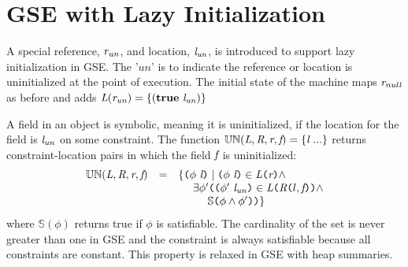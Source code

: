 \section{GSE with Lazy Initialization}

A special reference, $\emph{r}_\mathit{un}$, and location,
$\emph{l}_\mathit{un}$, is introduced to support lazy initialization
in GSE. The '$\mathit{un}$' is to indicate the reference or location
is uninitialized at the point of execution. The initial state of the
machine maps $\emph{r}_\mathit{null}$ as before and adds
$\emph{L}(\emph{r}_\mathit{un}) = \{(\textbf{true}\ \emph{l}_\mathit{un})\}$

A field in an object is symbolic, meaning it is uninitialized, if the
location for the field is $\emph{l}_\mathit{un}$ on some constraint. The function
$\mathbb{UN}(\emph{L}, \emph{R}, \emph{r}, \emph{f}) =
\{\emph{l}\ ...\}$ returns constraint-location pairs in which the field $\emph{f}$
is uninitialized:
\[
\begin{array}{rcl}
\mathbb{UN}(\cfgnt{L}, \cfgnt{R}, \cfgnt{r}, \cfgnt{f}) & = &\{ \lp\phi\ \cfgnt{l}\rp \mid \lp \phi\ \cfgnt{l}\rp  \in \cfgnt{L}\lp \cfgnt{r}\rp  \wedge \\
& & \ \ \ \ \exists \phi^\prime \lp \lp \phi^\prime\ \cfgnt{l}_\mathit{un}\rp  \in \cfgnt{L}\lp \cfgnt{R}\lp l,\cfgnt{f}\rp\rp \wedge \\
& & \ \ \ \ \ \ \ \ \mathbb{S}\lp \phi \wedge \phi^\prime \rp\rp\}\\
\end{array}
\]
where $\mathbb{S}(\phi)$ returns true if $\phi$ is satisfiable. The
cardinality of the set is never greater than one in GSE and the
constraint is always satisfiable because all constraints are
constant. This property is relaxed in GSE with heap summaries.




